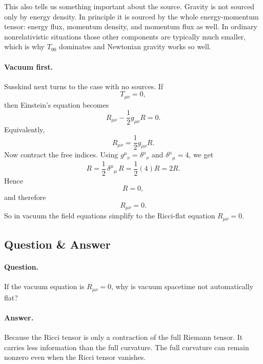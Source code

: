 This also tells us something important about the source. Gravity is not sourced only by energy density. In principle it is sourced by the whole energy-momentum tensor: energy flux, momentum density, and momentum flux as well. In ordinary nonrelativistic situations those other components are typically much smaller, which is why \(T_{00}\) dominates and Newtonian gravity works so well.

\paragraph{Vacuum first.} Susskind next turns to the case with no sources. If
\begin{equation}
T_{\mu\nu}=0,
\end{equation}
then Einstein's equation becomes
\begin{equation}
R_{\mu\nu}-\frac12 g_{\mu\nu}R=0.
\end{equation}
Equivalently,
\begin{equation}
R_{\mu\nu}=\frac12 g_{\mu\nu}R.
\end{equation}
Now contract the free indices. Using \(g^\mu{}_\nu=\delta^\mu{}_\nu\) and \(\delta^\mu{}_\mu=4\), we get
\begin{equation}
R=\frac12\,\delta^\mu{}_\mu\,R=\frac12(4)R=2R.
\end{equation}
Hence
\begin{equation}
R=0,
\end{equation}
and therefore
\begin{equation}
R_{\mu\nu}=0.
\end{equation}
So in vacuum the field equations simplify to the Ricci-flat equation \(R_{\mu\nu}=0\).

\subsection{Question \& Answer}

\paragraph{Question.} If the vacuum equation is \(R_{\mu\nu}=0\), why is vacuum spacetime not automatically flat?

\paragraph{Answer.} Because the Ricci tensor is only a contraction of the full Riemann tensor. It carries less information than the full curvature. The full curvature can remain nonzero even when the Ricci tensor vanishes.

